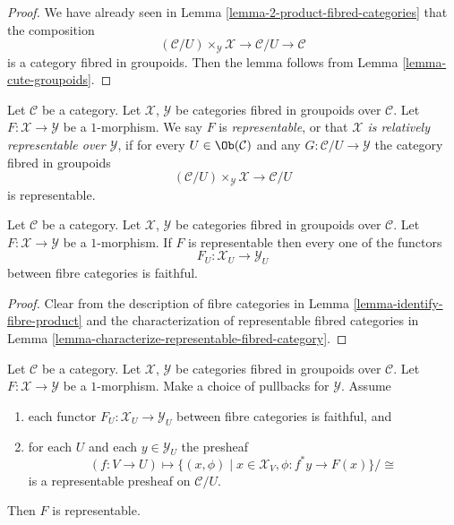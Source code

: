 \begin{proof}
We have already seen in Lemma \ref{lemma-2-product-fibred-categories}
that the composition
$$
(\mathcal{C}/U) \times_\mathcal{Y} \mathcal{X}
\longrightarrow
\mathcal{C}/U
\longrightarrow
\mathcal{C}
$$
is a category fibred in groupoids. Then the lemma follows from
Lemma \ref{lemma-cute-groupoids}.
\end{proof}

\begin{definition}
\label{definition-representable-map-categories-fibred-in-groupoids}
Let $\mathcal{C}$ be a category.
Let $\mathcal{X}$, $\mathcal{Y}$ be categories fibred in groupoids
over $\mathcal{C}$.
Let $F : \mathcal{X} \to \mathcal{Y}$ be a $1$-morphism.
We say $F$ is {\it representable}, or that
{\it $\mathcal{X}$ is relatively representable over $\mathcal{Y}$},
if for every $U \in \Ob(\mathcal{C})$
and any $G : \mathcal{C}/U \to \mathcal{Y}$
the category fibred in groupoids
$$
(\mathcal{C}/U) \times_\mathcal{Y} \mathcal{X}
\longrightarrow
\mathcal{C}/U
$$
is representable.
\end{definition}

\begin{lemma}
\label{lemma-spell-out-representable-map-stack-in-groupoids}
Let $\mathcal{C}$ be a category.
Let $\mathcal{X}$, $\mathcal{Y}$ be categories fibred in groupoids
over $\mathcal{C}$.
Let $F : \mathcal{X} \to \mathcal{Y}$ be a $1$-morphism.
If $F$ is representable then every one of the functors
$$
F_U : \mathcal{X}_U \longrightarrow \mathcal{Y}_U
$$
between fibre categories is faithful.
\end{lemma}

\begin{proof}
Clear from the description of fibre categories in
Lemma \ref{lemma-identify-fibre-product} and the characterization
of representable fibred categories in
Lemma \ref{lemma-characterize-representable-fibred-category}.
\end{proof}

\begin{lemma}
\label{lemma-criterion-representable-map-stack-in-groupoids}
Let $\mathcal{C}$ be a category.
Let $\mathcal{X}$, $\mathcal{Y}$ be categories fibred in groupoids
over $\mathcal{C}$.
Let $F : \mathcal{X} \to \mathcal{Y}$ be a $1$-morphism.
Make a choice of pullbacks for $\mathcal{Y}$.
Assume
\begin{enumerate}
\item each functor $F_U : \mathcal{X}_U \longrightarrow \mathcal{Y}_U$
between fibre categories is faithful, and
\item for each $U$ and each $y \in \mathcal{Y}_U$ the presheaf
$$
(f : V \to U)
\longmapsto
\{(x, \phi) \mid x \in \mathcal{X}_V, \phi : f^*y \to F(x)\}/\cong
$$
is a representable presheaf on $\mathcal{C}/U$.
\end{enumerate}
Then $F$ is representable.
\end{lemma}

